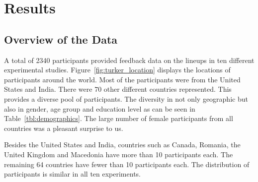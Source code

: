 \documentclass[10pt]{article}\usepackage[]{graphicx}\usepackage[]{xcolor}
\begin{document}
% 
% 
% 

\section{Results}\label{sec:result_socio}

\subsection{Overview of the Data} A total of 2340 participants provided feedback data on the lineups in ten different experimental studies. Figure~\ref{fig:turker_location} displays the locations of participants around the world.  Most of the participants were from the United States and India. There were 70 other different countries represented. This provides a diverse pool of participants. The diversity in not only  geographic but also in gender, age group and education level as can be seen in Table~\ref{tbl:demographics}. The large number of female participants from all countries was a pleasant surprise to us.


Besides the United States and India, countries such as Canada, Romania, the United Kingdom and Macedonia have more than 10 participants each. The remaining 64 countries have fewer than 10 participants each. The distribution of participants is similar in all ten experiments. 
\end{document}
